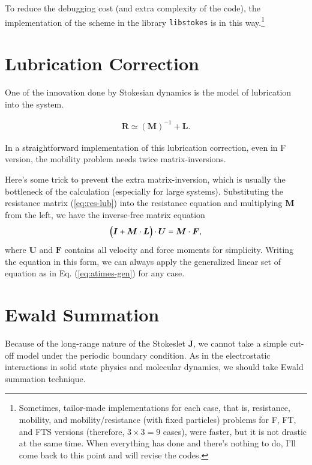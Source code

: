 \documentclass{book}
\begin{document}
To reduce the debugging cost (and extra complexity of the code),
the implementation of the scheme in the library {\tt libstokes}
is in this way.\footnote{
  Sometimes, tailor-made implementations for each case,
  that is, resistance, mobility, and mobility/resistance
  (with fixed particles) problems for F, FT, and FTS versions
  (therefore, $3\times 3 = 9$ cases), were faster,
  but it is not drastic at the same time.
  When everything has done and there's nothing to do,
  I'll come back to this point and will revise the codes.}




\section{Lubrication Correction}
One of the innovation done by Stokesian dynamics
\cite{brady1988a,durlofsky1987a,brady1988b}
is the model of lubrication into the system.

\begin{eqnarray}
  \bm{R}
  \simeq
  \left(
    \bm{M}
  \right)^{-1}
  +
  \bm{L}
  .
  \label{eq:res-lub}
\end{eqnarray}

In a straightforward implementation of this lubrication correction,
even in F version, the mobility problem needs twice matrix-inversions.

Here's some trick to prevent the extra matrix-inversion,
which is usually the bottleneck of the calculation
(especially for large systems).
Substituting the resistance matrix (\ref{eq:res-lub})
into the resistance equation and multiplying $\bm{M}$ from the left,
we have the inverse-free matrix equation
\begin{equation}
  \Bigl(
    \bm{I}
    +
    \bm{M}
    \cdot
    \bm{L}
  \Bigr)
  \cdot
  \bm{U}
  =
  \bm{M}
  \cdot
  \bm{F}
  ,
\end{equation}
where $\bm{U}$ and $\bm{F}$ contains all velocity and force moments
for simplicity.
Writing the equation in this form,
we can always apply the generalized linear set of equation
as in Eq. (\ref{eq:atimes-gen}) for any case.


\section{Ewald Summation}
Because of the long-range nature of the Stokeslet $\bm{J}$,
we cannot take a simple cut-off model under the periodic
boundary condition. As in the electrostatic interactions
in solid state physics and molecular dynamics, we should
take Ewald summation technique.
\end{document}
